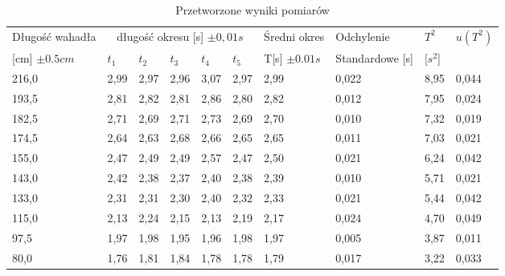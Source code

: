 \documentclass[a4paper,12pt]{article}
\begin{document}
\begin{table}[h]
	\centering
	\footnotesize
	\begin{tabular}{|l|l|l|l|l|l|l|l|l|l|}
		\hline
		Długość wahadła    & \multicolumn{5}{c|}{długość okresu [s] $\pm 0,01s$} & Średni okres & Odchylenie & $T^2$ & $u(T^2)$                                                        \\
		{[cm] $\pm 0.5cm$} & $t_1$                                          & $t_2$        & $t_3$      & $t_4$ & $t_5$    & T[s] $\pm 0.01s$ & Standardowe [s] & [$s^2$] &       \\\hline
		216,0             & 2,99                                           & 2,97         & 2,96       & 3,07  & 2,97     & 2,99             & 0,022           & 8,95    & 0,044 \\\hline
		193,5             & 2,81                                           & 2,82         & 2,81       & 2,86  & 2,80     & 2,82             & 0,012           & 7,95    & 0,024 \\\hline
		182,5             & 2,71                                           & 2,69         & 2,71       & 2,73  & 2,69     & 2,70             & 0,010           & 7,32    & 0,019 \\\hline
		174,5             & 2,64                                           & 2,63         & 2,68       & 2,66  & 2,65     & 2,65             & 0,011           & 7,03    & 0,021 \\\hline
		155,0             & 2,47                                           & 2,49         & 2,49       & 2,57  & 2,47     & 2,50             & 0,021           & 6,24    & 0,042 \\\hline
		143,0             & 2,42                                           & 2,38         & 2,37       & 2,40  & 2,38     & 2,39             & 0,010           & 5,71    & 0,021 \\\hline
		133,0             & 2,31                                           & 2,31         & 2,30       & 2,40  & 2,32     & 2,33             & 0,021           & 5,44    & 0,042 \\\hline
		115,0             & 2,13                                           & 2,24         & 2,15       & 2,13  & 2,19     & 2,17             & 0,024           & 4,70    & 0,049 \\\hline
		97,5             & 1,97                                           & 1,98         & 1,95       & 1,96  & 1,98     & 1,97             & 0,005           & 3,87    & 0,011 \\\hline
		80,0              & 1,76                                           & 1,81         & 1,84       & 1,78  & 1,78     & 1,79             & 0,017           & 3,22    & 0,033 \\\hline
	\end{tabular}
	\caption{Przetworzone wyniki pomiarów}
\end{table}
\clearpage
\end{document}
